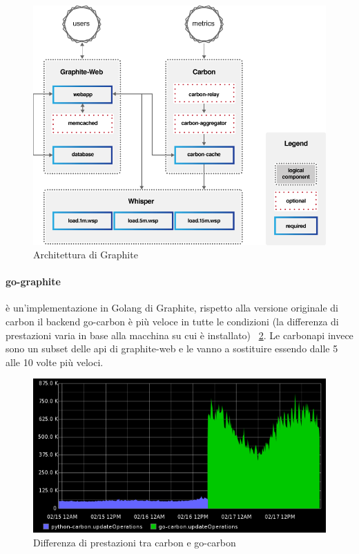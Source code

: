 \begin{figure}[h]
    \label{fig:graphite}
    \includegraphics[width=\hsize]{images/my_work/graphite.png}
    \caption{Architettura di Graphite}
    \centering
\end{figure}

\paragraph{go-graphite} è un'implementazione in Golang di Graphite, rispetto alla versione originale di carbon il backend
go-carbon è più veloce in tutte le condizioni (la differenza di prestazioni varia in base alla macchina su cui è installato) ~\ref{fig:gocarbon}.
Le carbonapi invece sono un subset delle api di graphite-web e le vanno a sostituire essendo dalle 5 alle 10 volte più veloci.

\begin{figure}[h]
    \label{fig:gocarbon}
    \includegraphics[width=\hsize]{images/my_work/go-carbon.png}
    \caption{Differenza di prestazioni tra carbon e go-carbon}
    \centering
\end{figure}


